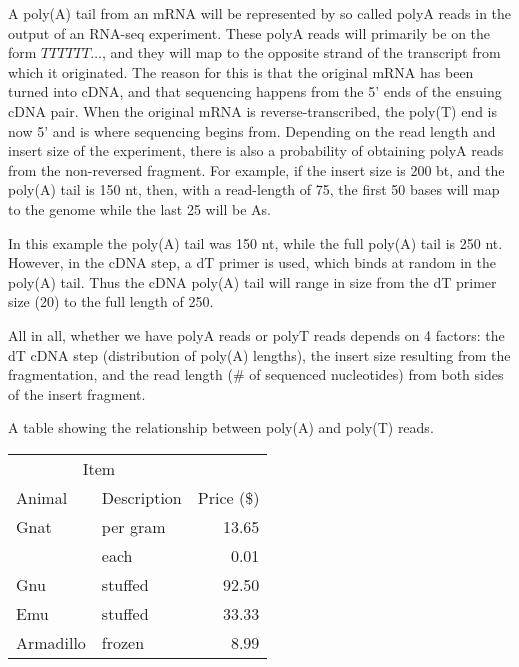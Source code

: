 \documentclass[a4paper]{article}
\begin{document}
A poly(A) tail from an mRNA will be represented by so called polyA reads in
the output of an RNA-seq experiment. These polyA reads will primarily be on
the form $TTTTTT\ldots$, and they will map to the opposite strand of the
transcript from which it originated. The reason for this is that the original
mRNA has been turned into cDNA, and that sequencing happens from the 5' ends
of the ensuing cDNA pair. When the original mRNA is reverse-transcribed, the
poly(T) end is now 5' and is where sequencing begins from. Depending on the
read length and insert size of the experiment, there is also a probability of
obtaining polyA reads from the non-reversed fragment. For example, if the
insert size is 200 bt, and the poly(A) tail is 150 nt, then, with a read-length
of 75, the first 50 bases will map to the genome while the last 25 will be As.

In this example the poly(A) tail was 150 nt, while the full poly(A) tail is 250
nt. However, in the cDNA step, a dT primer is used, which binds at random in
the poly(A) tail. Thus the cDNA poly(A) tail will range in size from the dT
primer size (20) to the full length of 250.

All in all, whether we have polyA reads or polyT reads depends on 4 factors:
the dT cDNA step (distribution of poly(A) lengths), the insert size resulting
from the fragmentation, and the read length (# of sequenced nucleotides) from
both sides of the insert fragment.

A table showing the relationship between poly(A) and poly(T) reads.

\begin{tabular}{llr}
\toprule
\multicolumn{2}{c}{Item} \\
\cmidrule(r){1-2}
Animal & Description & Price (\$) \\
\midrule
Gnat  & per gram & 13.65 \\
      & each     &  0.01 \\
Gnu   & stuffed  & 92.50 \\
Emu   & stuffed  & 33.33 \\
Armadillo & frozen & 8.99 \\
\bottomrule
\end{tabular}



\end{document}
